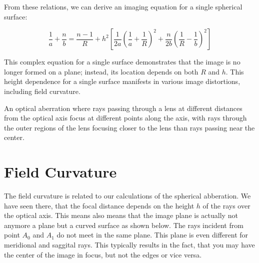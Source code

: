 \documentclass[
  a4paper,
]{book}
\begin{document}
From these relations, we can derive an imaging equation for a single
spherical surface:

\[
\frac{1}{a}+\frac{n}{b}=\frac{n-1}{R}+h^2\left [ \frac{1}{2a}\left ( \frac{1}{a}+\frac{1}{R}\right )^2 +\frac{n}{2b}\left ( \frac{1}{R}-\frac{1}{b}\right )^2\right]
\]

This complex equation for a single surface demonstrates that the image
is no longer formed on a plane; instead, its location depends on both
\(R\) and \(h\). This height dependence for a single surface manifests
in various image distortions, including field curvature.

\begin{tcolorbox}[enhanced jigsaw, coltitle=black, title=\textcolor{quarto-callout-note-color}{\faInfo}\hspace{0.5em}{Spherical Aberration}, colframe=quarto-callout-note-color-frame, toprule=.15mm, opacitybacktitle=0.6, left=2mm, opacityback=0, breakable, toptitle=1mm, bottomtitle=1mm, leftrule=.75mm, arc=.35mm, titlerule=0mm, colbacktitle=quarto-callout-note-color!10!white, rightrule=.15mm, bottomrule=.15mm, colback=white]

An optical aberration where rays passing through a lens at different
distances from the optical axis focus at different points along the
axis, with rays through the outer regions of the lens focusing closer to
the lens than rays passing near the center.

\end{tcolorbox}

\section{Field Curvature}\label{field-curvature}

The field curvature is related to our calculations of the spherical
abberation. We have seen there, that the focal distance depends on the
height \(h\) of the rays over the optical axis. This means also means
that the image plane is actually not anymore a plane but a curved
surface as shown below. The rays incident from point \(A_0\) and \(A_1\)
do not meet in the same plane. This plane is even different for
meridional and saggital rays. This typically results in the fact, that
you may have the center of the image in focus, but not the edges or vice
versa.
\end{document}
